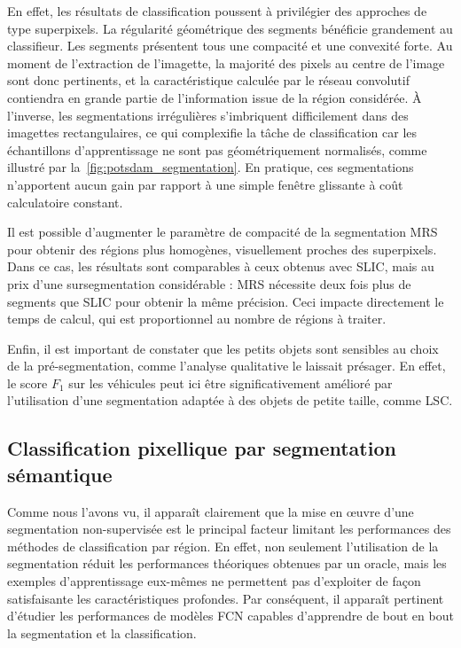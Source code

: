 En effet, les résultats de classification poussent à privilégier des approches de type superpixels. La régularité géométrique des segments bénéficie grandement au classifieur. Les segments présentent tous une compacité et une convexité forte. Au moment de l'extraction de l'imagette, la majorité des pixels au centre de l'image sont donc pertinents, et la caractéristique calculée par le réseau convolutif contiendra en grande partie de l'information issue de la région considérée. À l'inverse, les segmentations irrégulières s'imbriquent difficilement dans des imagettes rectangulaires, ce qui complexifie la tâche de classification car les échantillons d'apprentissage ne sont pas géométriquement normalisés, comme illustré par la~\cref{fig:potsdam_segmentation}. En pratique, ces segmentations n'apportent aucun gain par rapport à une simple fenêtre glissante à coût calculatoire constant.

Il est possible d'augmenter le paramètre de compacité de la segmentation \gls{MRS} pour obtenir des régions plus homogènes, visuellement proches des superpixels. Dans ce cas, les résultats sont comparables à ceux obtenus avec \gls{SLIC}, mais au prix d'une sursegmentation considérable : \gls{MRS} nécessite deux fois plus de segments que \gls{SLIC} pour obtenir la même précision. Ceci impacte directement le temps de calcul, qui est proportionnel au nombre de régions à traiter.

Enfin, il est important de constater que les petits objets sont sensibles au choix de la pré-segmentation, comme l'analyse qualitative le laissait présager. En effet, le score $F_1$ sur les véhicules peut ici être significativement amélioré par l'utilisation d'une segmentation adaptée à des objets de petite taille, comme \gls{LSC}.

\subsection{Classification pixellique par segmentation sémantique}
\label{sec:results_pixel}

Comme nous l'avons vu, il apparaît clairement que la mise en \oe{}uvre d'une segmentation non-supervisée est le principal facteur limitant les performances des méthodes de classification par région. En effet, non seulement l'utilisation de la segmentation réduit les performances théoriques obtenues par un oracle, mais les exemples d'apprentissage eux-mêmes ne permettent pas d'exploiter de façon satisfaisante les caractéristiques profondes. Par conséquent, il apparaît pertinent d'étudier les performances de modèles \gls{FCN} capables d'apprendre de bout en bout la segmentation et la classification.

